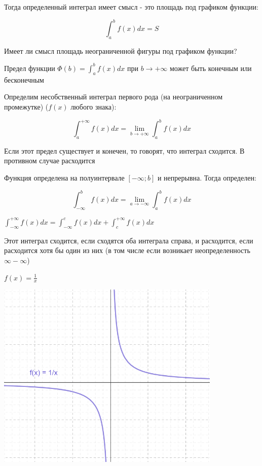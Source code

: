 \documentclass[12pt]{article}
\begin{document}
    Тогда определенный интеграл имеет смысл - это площадь под графиком функции:

    \[\int^{b}_{a} f(x) dx = S\]

    Имеет ли смысл площадь неограниченной фигуры под графиком функции?

    Предел функции $\Phi (b) = \int^{b}_{a} f(x) dx$ при $b \to +\infty$ может быть конечным или бесконечным

     \hypertarget{improperintegralfirstkind}{Определим несобственный интеграл первого рода} (на неограниченном промежутке) ($f(x)$ любого знака):

    \[\int^{+\infty}_{a} f(x) dx = \lim_{b \to +\infty} \int^{b}_{a} f(x) dx\]

    \Nota Если этот предел существует и конечен, то говорят, что интеграл сходится. В противном случае расходится

     Функция определена на полуинтервале $[-\infty; b]$ и непрерывна. Тогда определен:

    \[\int^{b}_{-\infty} f(x) dx = \lim_{a \to -\infty} \int^{b}_{a} f(x) dx\]

     $\displaystyle \int^{+\infty}_{-\infty} f(x) dx = \int^{c}_{-\infty} f(x) dx + \int^{+\infty}_{c} f(x) dx$

    \Nota Этот интеграл сходится, если сходятся оба интеграла справа, и расходится, если расходится хотя бы один из них
    (в том числе если возникает неопределенность $\infty - \infty$)

    \Ex $f(x) = \frac{1}{x}$

    \includegraphics[height=90mm]{calculus/images/calculus_2024_02_21_2}
\end{document}
